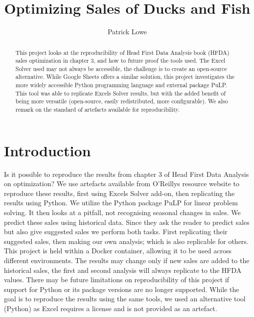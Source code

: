 \documentclass[acmtog]{acmart}
\begin{document}
\title{Optimizing Sales of Ducks and Fish}
\author{Patrick Lowe}

\begin{abstract}
This project looks at the reproducibility of Head First Data Analysis book (HFDA) sales optimization in chapter 3, and how to future proof the tools used. The Excel Solver used may not always be accessible, the challenge is to create an open-source alternative. While Google Sheets offers a similar solution, this project investigates the more widely accessible Python programming language and external package PuLP. This tool was able to replicate Excels Solver results, but with the added benefit of being more versatile (open-source, easily redistributed, more configurable). We also remark on the standard of artefacts available for reproducibility.
\end{abstract}

\maketitle

\section{Introduction}
Is it possible to reproduce the results from chapter 3 of Head First Data Analysis on optimization? We use artefacts available from O'Reillys resource website to reproduce these results, first using Excels Solver add-on, then replicating the results using Python. We utilize the Python package PuLP for linear problem solving. It then looks at a pitfall, not recognising seasonal changes in sales. We predict these sales using historical data. Since they ask the reader to predict sales but also give suggested sales we perform both tasks. First replicating their suggested sales, then making our own analysis; which is also replicable for others. This project is held within a Docker container, allowing it to be used across different environments. The results may change only if new sales are added to the historical sales, the first and second analysis will always replicate to the HFDA values. There may be future limitations on reproducibility of this project if support for Python or its package versions are no longer supported. While the goal is to reproduce the results using the same tools, we used an alternative tool (Python) as Excel requires a license and is not provided as an artefact.
\end{document}

